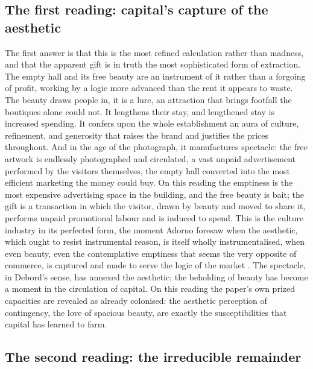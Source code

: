 \subsection{The first reading: capital's capture of the aesthetic}
\label{p21:sub:pe-capture}

The first answer is that this is the most refined calculation rather than madness, and that the apparent gift is in truth the most sophisticated form of extraction. The empty hall and its free beauty are an instrument of it rather than a forgoing of profit, working by a logic more advanced than the rent it appears to waste. The beauty draws people in, it is a lure, an attraction that brings footfall the boutiques alone could not. It lengthens their stay, and lengthened stay is increased spending. It confers upon the whole establishment an aura of culture, refinement, and generosity that raises the brand and justifies the prices throughout. And in the age of the photograph, it manufactures spectacle: the free artwork is endlessly photographed and circulated, a vast unpaid advertisement performed by the visitors themselves, the empty hall converted into the most efficient marketing the money could buy. On this reading the emptiness is the most expensive advertising space in the building, and the free beauty is bait; the gift is a transaction in which the visitor, drawn by beauty and moved to share it, performs unpaid promotional labour and is induced to spend. This is the culture industry in its perfected form, the moment Adorno foresaw when the aesthetic, which ought to resist instrumental reason, is itself wholly instrumentalised, when even beauty, even the contemplative emptiness that seems the very opposite of commerce, is captured and made to serve the logic of the market \parencite{adorno1997,debord1994}. The spectacle, in Debord's sense, has annexed the aesthetic; the beholding of beauty has become a moment in the circulation of capital. On this reading the paper's own prized capacities are revealed as already colonised: the aesthetic perception of contingency, the love of spacious beauty, are exactly the susceptibilities that capital has learned to farm.

\subsection{The second reading: the irreducible remainder}
\label{p21:sub:pe-remainder}

